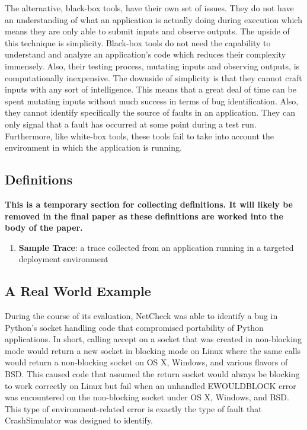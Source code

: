         The alternative, black-box tools, have their own set of issues. They do not have an understanding of what an
        application is actually doing during execution which means they are only able to submit inputs and observe
        outputs.  The upside of this technique is simplicity. Black-box tools do not need the capability to understand
        and analyze an application's code which reduces their complexity immensely. Also, their testing process,
        mutating inputs and observing outputs, is computationally inexpensive. The downside of simplicity is that they
        cannot craft inputs with any sort of intelligence. This means that a great deal of time can be spent mutating
        inputs without much success in terms of bug identification. Also, they cannot identify specifically the source
        of faults in an application. They can only signal that a fault has occurred at some point during a test run.
        Furthermore, like white-box tools, these tools fail to take into account the environment in which the
        application is running.

    \subsection{Definitions}
        \textbf{This is a temporary section for collecting definitions. It will likely be removed in the final paper as
        these definitions are worked into the body of the paper.}
        \begin{enumerate}
            \item{\textbf{Sample Trace}: a trace collected from an application running in a targeted deployment
                environment}
        \end{enumerate}

    \subsection{A Real World Example}

        During the course of its evaluation, NetCheck was able to identify a bug in Python's socket handling code that
        compromised portability of Python applications. In short, calling accept on a socket that was created in
        non-blocking mode would return a new socket in blocking mode on Linux where the same calls would return a
        non-blocking socket on OS X, Windows, and various flavors of BSD\@. This caused code that assumed the return
        socket would always be blocking to work correctly on Linux but fail when an unhandled EWOULDBLOCK error was
        encountered on the non-blocking socket under OS X, Windows, and BSD\@. This type of environment-related error is
        exactly the type of fault that CrashSimulator was designed to identify.
